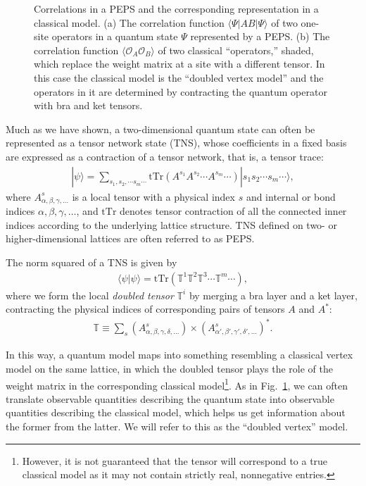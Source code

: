 \documentclass[aps,prb,letterpaper,superscriptaddress,twocolumn,showpacs,floatfix,10pt]{revtex4-1}
\begin{document}
\begin{figure}[h]
\begin{subfigure}
  \end{subfigure}
  \caption{Correlations in a PEPS and the corresponding representation in a
  classical model. (a) The  correlation function $\langle\Psi|AB|\Psi\rangle$
  of two one-site operators in a quantum state $\Psi$ represented by a PEPS.
  (b) The correlation function $\langle\mathcal{O}_A\mathcal{O}_B\rangle$
  of two classical ``operators,'' shaded, which replace the weight matrix at a
  site
  with a different tensor. In this case the classical model is the ``doubled
  vertex model'' and the operators in it are determined by contracting the
  quantum operator with bra and ket tensors.}
\label{fig:quantumclassical}
\end{figure}
Much as we have shown, a two-dimensional quantum state can often be represented
as a
tensor network state (TNS),  whose coefficients in a fixed basis are expressed
as a contraction of a tensor network, that is, a tensor trace:
\begin{align}
|\psi\rangle=\sum_{s_1,s_2,\cdots s_m\cdots}\text{tTr}(A^{s_1}A^{s_2}\cdots A^{s_m}\cdots)|s_1 s_2\cdots s_m\cdots\rangle, 
\label{TNS}
\end{align} 
where $A^s_{\alpha,\beta,\gamma,\ldots}$ is a local tensor with a physical index
$s$ and internal or bond indices $\alpha,\beta,\gamma,\ldots$, and $\text{tTr}$
denotes tensor contraction of all the connected inner indices according to the
underlying lattice structure. TNS defined on two- or higher-dimensional lattices
are often referred to as PEPS.

The norm squared of a TNS is given by 
\begin{align}
\langle \psi |  \psi \rangle =\text{tTr} (\mathbb{T}^1  \mathbb{T}^2  \mathbb{T}^3\cdots \mathbb{T}^m\cdots   ), 
\label {ST_TNS}
\end{align} 
where we form the local {\it doubled tensor\/} $\mathbb{T}^i$ by
merging a bra layer and a ket layer, contracting the physical indices of
corresponding pairs of tensors $A$ and $A^*$:
\begin{align}
\mathbb{T}\equiv \sum _s  (A^s_{\alpha,\beta, \gamma,\delta,\ldots })  \times  (A^s_{\alpha',\beta', \gamma',\delta',\ldots }) ^*.
\label{eqn:doubletensor}
\end{align}

In this way, a quantum model maps into something resembling a classical
vertex model on the same lattice, in which the doubled tensor plays the role
of the weight matrix in the corresponding classical model\footnote{However,
it is not guaranteed that the tensor will correspond to a true classical model
as it may not contain strictly real, nonnegative entries.}. As in
Fig.~\ref{fig:quantumclassical}, we can often translate observable quantities
describing the
quantum state into observable quantities describing the classical
model, which helps us get information about the former from the latter.
We will refer to this as the ``doubled vertex'' model.
\end{document}
